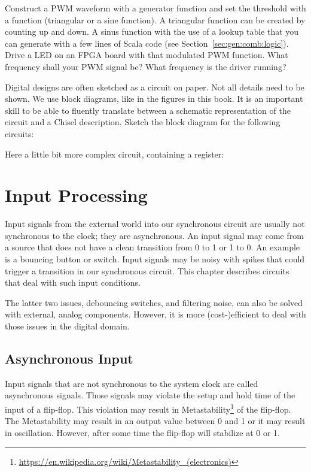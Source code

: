 \documentclass[%
    10pt,
    headinclude, footexclude,
    openright, %
    notitlepage,
    cleardoubleempty,
    headsepline,
    pointlessnumbers,
    bibtotoc, idxtotoc,
    ]{scrbook}
\newcommand{\todo}[1]{{\emph{TODO: #1}}}
\newcommand{\myref}[2]{\href{#1}{#2}}
\renewcommand{\myref}[2]{{#2}{\footnote{\url{#1}}}}
\renewcommand{\todo}[1]{}
\begin{document}
Construct a PWM waveform with a generator function and set the threshold with a
function (triangular or a sine function).
A triangular function can be created by counting up and down. A sinus function with the
use of a lookup table that you can generate with a few lines of Scala code
(see Section~\ref{sec:gen:comb:logic}).
Drive a LED on an FPGA board with that modulated PWM function. What frequency shall your
PWM signal be? What frequency is the driver running?

Digital designs are often sketched as a circuit on paper. Not all details need to be shown.
We use block diagrams, like in the figures in this book. It is an important skill to be able
to fluently translate between a schematic representation of the circuit and a Chisel description.
Sketch the block diagram for the following circuits:


\noindent Here a little bit more complex circuit, containing a register:


\todo{Luca: More exercises would be nice. Maybe in the future?}

\chapter{Input Processing}

Input signals from the external world into our synchronous circuit are usually
not synchronous to the clock; they are asynchronous.
An input signal may come from a source that does not have a clean transition from
0 to 1 or 1 to 0. An example is a bouncing button or switch.
Input signals may be noisy with spikes that could trigger a transition in our
synchronous circuit. This chapter describes circuits that deal with such input
conditions.

The latter two issues, debouncing switches, and filtering noise, can also be
solved with external, analog components. However, it is more (cost-)efficient
to deal with those issues in the digital domain.

\section{Asynchronous Input}


\todo{read Dally on this topic to check for correct wording and facts.}

Input signals that are not synchronous to the system clock are called
asynchronous signals. Those signals may violate the setup and hold time
of the input of a flip-flop. This violation may result in
\myref{https://en.wikipedia.org/wiki/Metastability_(electronics)}{Metastability}
of the flip-flop. The Metastability may result in an output value between 0 and
1 or it may result in oscillation. However, after some time the flip-flop will
stabilize at 0 or 1.
\end{document}

